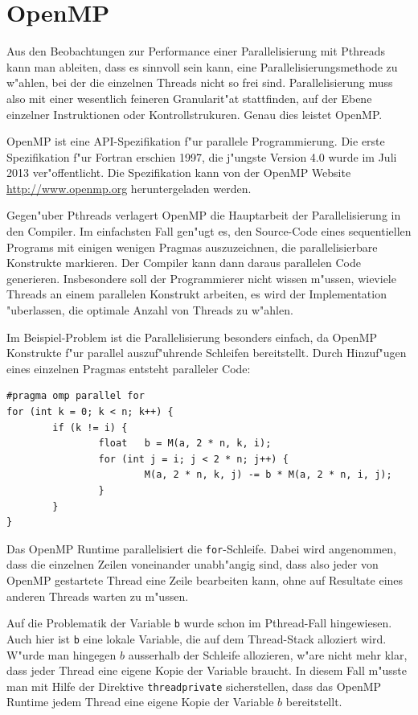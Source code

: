 \section{OpenMP\label{openmp-intro}}
Aus den Beobachtungen zur Performance einer Parallelisierung mit
Pthreads kann man ableiten, dass es sinnvoll sein kann,
eine Parallelisierungsmethode zu w"ahlen, bei der die einzelnen
Threads nicht so frei sind.
Parallelisierung muss also mit einer wesentlich feineren Granularit"at
stattfinden, auf der Ebene einzelner Instruktionen oder Kontrollstrukuren.
Genau dies leistet OpenMP.

OpenMP ist eine API-Spezifikation f"ur parallele Programmierung.
Die erste Spezifikation f"ur Fortran erschien 1997, die j"ungste 
Version 4.0 wurde im Juli 2013 ver"offentlicht.
Die Spezifikation kann von der OpenMP Website \url{http://www.openmp.org}
heruntergeladen werden.

Gegen"uber Pthreads verlagert OpenMP die Hauptarbeit der Parallelisierung
in den Compiler. 
Im einfachsten Fall gen"ugt es, den Source-Code eines sequentiellen Programs
mit einigen wenigen Pragmas auszuzeichnen, die parallelisierbare
Konstrukte markieren. Der Compiler kann dann daraus parallelen Code
generieren. Insbesondere soll der Programmierer nicht wissen m"ussen, wieviele
Threads an einem parallelen Konstrukt arbeiten, es wird der Implementation
"uberlassen, die optimale Anzahl von Threads zu w"ahlen.

Im Beispiel-Problem ist die Parallelisierung besonders einfach, da
OpenMP Konstrukte f"ur parallel auszuf"uhrende Schleifen bereitstellt.
Durch Hinzuf"ugen eines einzelnen Pragmas entsteht paralleler Code:
\begin{verbatim}
#pragma omp parallel for
for (int k = 0; k < n; k++) {
        if (k != i) {
                float   b = M(a, 2 * n, k, i);
                for (int j = i; j < 2 * n; j++) {
                        M(a, 2 * n, k, j) -= b * M(a, 2 * n, i, j);
                }
        }
}
\end{verbatim}
Das OpenMP Runtime parallelisiert die {\tt for}-Schleife. Dabei wird
angenommen, dass die einzelnen Zeilen voneinander unabh"angig sind, dass
also jeder von OpenMP gestartete Thread eine Zeile bearbeiten kann,
ohne auf Resultate eines anderen Threads warten zu m"ussen.

Auf die Problematik der Variable {\tt b} wurde schon im Pthread-Fall
hingewiesen. Auch hier ist {\tt b} eine lokale Variable, die auf
dem Thread-Stack alloziert wird. W"urde man hingegen $b$ ausserhalb
der Schleife allozieren, w"are nicht mehr klar, dass jeder Thread
eine eigene Kopie der Variable braucht. In diesem Fall m"usste man
mit Hilfe der Direktive {\tt threadprivate} sicherstellen, dass
das OpenMP Runtime jedem Thread eine eigene Kopie der Variable $b$
bereitstellt.

